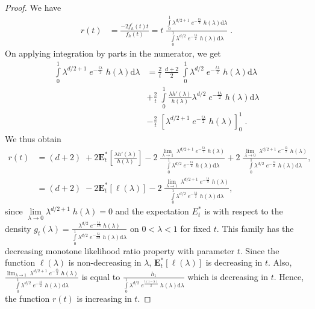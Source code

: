 \documentclass[11pt]{article}
\theoremstyle{definition}
\begin{document}
\begin{proof}
    We have 
    \begin{align}
    \nonumber r(t) & = \frac{-2f_h^{'}(t)t}{f_h(t)}  =  t\;\frac{\int\limits_{0}^{1} \lambda^{d/2 + 1}\;e^{-\frac{t\lambda}{2}}\; h(\lambda)\text{d}\lambda}{\int\limits_{0}^{1} \lambda^{d/2}\;e^{-\frac{t\lambda}{2}}\; h(\lambda)\text{d}\lambda}\;. 
\end{align}
On applying integration  by parts in the numerator, we get
\begin{align}
   \nonumber  \int\limits_{0}^{1} \lambda^{d/2 + 1}\;e^{-\frac{t\lambda}{2}}\; h(\lambda)\text{d}\lambda & = \frac{2}{t}\;\frac{d + 2}{2}\;\int\limits_{0}^{1} \lambda^{d/2 }\;e^{-\frac{t\lambda}{2}}\; h(\lambda)\text{d}\lambda \\
   \nonumber & + \frac{2}{t}\;\int\limits_{0}^{1} \frac{\lambda h'(\lambda)}{h(\lambda)} \lambda^{d/2}\;e^{-\frac{t\lambda}{2}}\; h(\lambda)\text{d}\lambda \\
    \nonumber & - \frac{2}{t}\;\left[\lambda ^{d/2 + 1}\;e^{-\frac{t\lambda}{2}}\; h(\lambda) \right]_{0}^{1}\;.
\end{align}
We thus obtain 
\begin{align}
    \nonumber r(t) & = (d + 2 )\; + 2\mathbf{E}^{*}_t\left[\frac{\lambda h'(\lambda)}{h(\lambda)}\right] - 2\; \frac{\lim_{\lambda \to 1} \;\lambda ^{d/2 + 1}\;e^{-\frac{t\lambda}{2}}\; h(\lambda)}{\int\limits_{0}^{1} \lambda^{d/2}\;e^{-\frac{t\lambda}{2}}\; h(\lambda)\text{d}\lambda} + 2\;\frac{\lim_{\lambda \to 0}\;\lambda ^{d/2 + 1}\;e^{-\frac{t\lambda}{2}}\; h(\lambda)}{\int\limits_{0}^{1} \lambda^{d/2}\;e^{-\frac{t\lambda}{2}}\; h(\lambda)\text{d}\lambda}, \\
    \nonumber & = (d + 2 )\; - 2\mathbf{E}^{*}_t [\ell(\lambda)] - 2\; \frac{\lim_{\lambda \to 1} \;\lambda ^{d/2 + 1}\;e^{-\frac{t\lambda}{2}}\; h(\lambda)}{\int\limits_{0}^{1} \lambda^{d/2}\;e^{-\frac{t\lambda}{2}}\; h(\lambda)\text{d}\lambda} , 
\end{align}
since $\lim\limits_{\lambda \to 0}\lambda^{d/2+1}\; h(\lambda) = 0 $ and  the expectation $E^{*}_t$ is with respect to the density $ g_t(\lambda) =\frac{\lambda^{d/2}\;e^{-\frac{t\lambda}{2A}}\; h(\lambda)}{\int\limits_{0}^{1} \lambda^{d/2}\;e^{-\frac{t\lambda}{2A}}\; h(\lambda)\text{d}\lambda}$ on  $0 < \lambda < 1$ for fixed $t$. This family has the decreasing monotone likelihood ratio property with parameter $t$.  Since the function $\ell(\lambda) $ is non-decreasing in $\lambda$, $\mathbf{E}^{*}_t [\ell(\lambda)]$ is decreasing in $t$. Also, $\frac{\lim_{\lambda \to 1} \;\lambda ^{d/2 + 1}\;e^{-\frac{t\lambda}{2}}\; h(\lambda)}{\int\limits_{0}^{1} \lambda^{d/2}\;e^{-\frac{t\lambda}{2}}\; h(\lambda)\text{d}\lambda}$ is equal to $\frac{h_1}{\int\limits_{0}^{1} \lambda^{d/2}\;e^{\frac{t(1 - \lambda)}{2}}\; h(\lambda)\text{d}\lambda}$ which is decreasing in $t$.  Hence, the function $r(t)$ is increasing in $t$. 

\end{proof}
\end{document}
